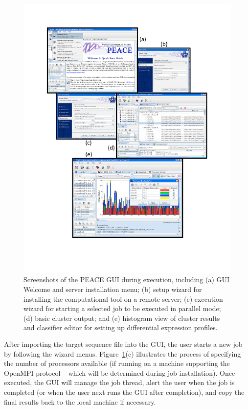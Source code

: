 \documentclass[a4,center,fleqn]{NAR}
\newcommand{\peace} {{\small PEACE}}
\begin{document}
\begin{figure}
  \centerline{ 
    \includegraphics[trim=0cm 3cm 0cm 1cm, clip, scale=0.9]{screen.d/screen.pdf}
  }
  \caption{Screenshots of the \peace\/ GUI during execution, including (a)
    GUI Welcome and server installation menu; (b) setup wizard for
    installing the computational tool on a remote server; (c) execution
    wizard for starting a selected job to be executed in parallel mode;
    (d) basic cluster output; and (e) histogram view of cluster results
    and classifier editor for setting up differential expression profiles.}\label{screen}
\end{figure}

 After importing the target sequence
file into the GUI, the user starts a new job by following the wizard
menus.  Figure~\ref{screen}(c) illustrates the process of specifying
the number of processors available (if running on a machine supporting
the OpenMPI protocol -- which will be determined during job
installation).  Once executed, the GUI will manage the job thread,
alert the user when the job is completed (or when the user next runs
the GUI after completion), and copy the final results back to the
local machine if necessary.
\end{document}
